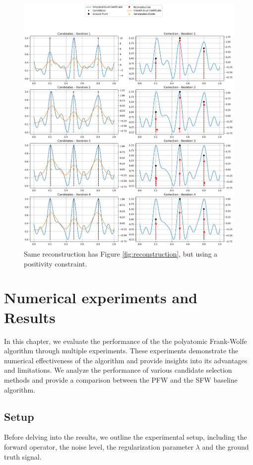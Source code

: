\documentclass[a4paper,12pt,oneside]{report}
\theoremstyle{named}
\begin{document}
\begin{figure}[t!]
\centering
\includegraphics[width=1\linewidth]{reconstruction2.png}
\caption{Same reconstruction has Figure \ref{fig:reconstruction}, but using a positivity constraint.}
\label{fig:reconstruction2}
\end{figure}

\chapter{Numerical experiments and Results}
In this chapter, we evaluate the performance of the the polyatomic Frank-Wolfe algorithm through multiple experiments. These experiments demonstrate the numerical effectiveness of the algorithm and provide insights into its advantages and limitations. We analyze the performance of various candidate selection methods and provide a comparison between the PFW and the SFW baseline algorithm. 

\section{Setup} \label{setup}
Before delving into the results, we outline the experimental setup, including the forward operator, the noise level, the regularization parameter $\lambda$ and the ground truth signal.
\end{document}

